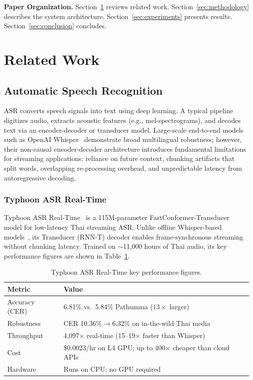 \documentclass[10pt, a4paper, twocolumn]{article}
\begin{document}
\noindent\textbf{Paper Organization.}
Section~\ref{sec:related} reviews related work.
Section~\ref{sec:methodology} describes the system architecture.
Section~\ref{sec:experiments} presents results.
Section~\ref{sec:conclusion} concludes.

\section{Related Work}
\label{sec:related}

\subsection{Automatic Speech Recognition}
ASR converts speech signals into text using deep learning.
A typical pipeline digitizes audio, extracts acoustic features (e.g., mel-spectrograms), and decodes text via an encoder-decoder or transducer model.
Large-scale end-to-end models such as OpenAI Whisper~\cite{radford2022whisper} demonstrate broad multilingual robustness; however, their non-causal encoder-decoder architecture introduces fundamental limitations for streaming applications: reliance on future context, chunking artifacts that split words, overlapping re-processing overhead, and unpredictable latency from autoregressive decoding.

\subsubsection{Typhoon ASR Real-Time}
Typhoon ASR Real-Time~\cite{sirichotedumrong2026typhoonasr} is a 115M-parameter FastConformer-Transducer model for low-latency Thai streaming ASR.
Unlike offline Whisper-based models~\cite{tipaksorn2024pathumma,aung2024thonburian}, its Transducer (RNN-T) decoder enables frame-synchronous streaming without chunking latency.
Trained on $\sim$11{,}000 hours of Thai audio, its key performance figures are shown in Table~\ref{tab:typhoon_perf}.

\begin{table}[h]
    \centering
    \caption{Typhoon ASR Real-Time key performance figures.}
    \label{tab:typhoon_perf}
    \small
    \begin{tabular}{@{}lp{4.5cm}@{}}
        \toprule
        \textbf{Metric} & \textbf{Value} \\
        \midrule
        Accuracy (CER) & 6.81\% vs.\ 5.84\% Pathumma ($13\times$ larger) \\
        Robustness & CER 10.36\%$\to$6.32\% on in-the-wild Thai media \\
        Throughput & 4{,}097$\times$ real-time (15--19$\times$ faster than Whisper) \\
        Cost & \$0.0023/hr on L4 GPU; up to 400$\times$ cheaper than cloud APIs \\
        Hardware & Runs on CPU; no GPU required \\
        \bottomrule
    \end{tabular}
\end{table}
\end{document}

